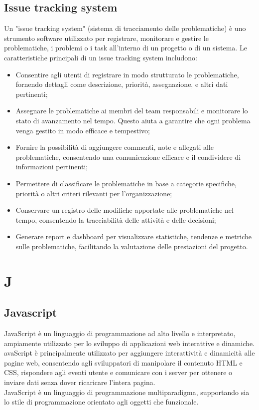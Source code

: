 \documentclass{article}
\begin{document}
\subsection{Issue tracking system}
Un "issue tracking system" (sistema di tracciamento delle problematiche) è uno strumento software utilizzato per registrare, monitorare e gestire le problematiche, i problemi o i task all'interno di un progetto o di un sistema. Le caratteristiche principali di un issue tracking system includono:
\begin{itemize}
    \item Consentire agli utenti di registrare in modo strutturato le problematiche, fornendo dettagli come descrizione, priorità, assegnazione, e altri dati pertinenti;
    \item Assegnare le problematiche ai membri del team responsabili e monitorare lo stato di avanzamento nel tempo. Questo aiuta a garantire che ogni problema venga gestito in modo efficace e tempestivo;
    \item Fornire la possibilità di aggiungere commenti, note e allegati alle problematiche, consentendo una comunicazione efficace e il condividere di informazioni pertinenti;
    \item Permettere di classificare le problematiche in base a categorie specifiche, priorità o altri criteri rilevanti per l'organizzazione;
    \item Conservare un registro delle modifiche apportate alle problematiche nel tempo, consentendo la tracciabilità delle attività e delle decisioni;
    \item Generare report e dashboard per visualizzare statistiche, tendenze e metriche sulle problematiche, facilitando la valutazione delle prestazioni del progetto.
\end{itemize}

\section{J}
\subsection{Javascript}
JavaScript è un linguaggio di programmazione ad alto livello e interpretato, ampiamente utilizzato per lo sviluppo di applicazioni web interattive e dinamiche.\\
avaScript è principalmente utilizzato per aggiungere interattività e dinamicità alle pagine web, consentendo agli sviluppatori di manipolare il contenuto HTML e CSS, rispondere agli eventi utente e comunicare con i server per ottenere o inviare dati senza dover ricaricare l'intera pagina.\\
JavaScript è un linguaggio di programmazione multiparadigma, supportando sia lo stile di programmazione orientato agli oggetti che funzionale.
\end{document}
